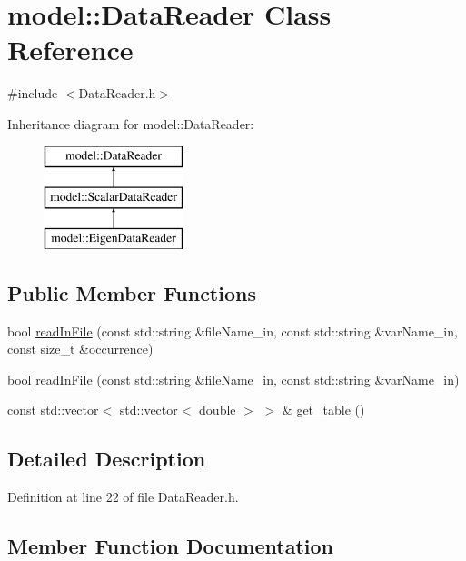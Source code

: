 \hypertarget{classmodel_1_1_data_reader}{}\section{model\+:\+:Data\+Reader Class Reference}
\label{classmodel_1_1_data_reader}


{\ttfamily \#include $<$Data\+Reader.\+h$>$}

Inheritance diagram for model\+:\+:Data\+Reader\+:\begin{figure}[H]
\begin{center}
\leavevmode
\includegraphics[height=3.000000cm]{classmodel_1_1_data_reader}
\end{center}
\end{figure}
\subsection*{Public Member Functions}
\begin{DoxyCompactItemize}
\item 
bool \hyperlink{classmodel_1_1_data_reader_adafdb72c4799ee1f01d9fe9ee1ab98e2}{read\+In\+File} (const std\+::string \&file\+Name\+\_\+in, const std\+::string \&var\+Name\+\_\+in, const size\+\_\+t \&occurrence)
\item 
bool \hyperlink{classmodel_1_1_data_reader_a52fc145f89f02fc5d0f0132ba37da9eb}{read\+In\+File} (const std\+::string \&file\+Name\+\_\+in, const std\+::string \&var\+Name\+\_\+in)
\item 
const std\+::vector$<$ std\+::vector$<$ double $>$ $>$ \& \hyperlink{classmodel_1_1_data_reader_a63b06785038e1f3dd4f003e6aecde5db}{get\+\_\+table} ()
\end{DoxyCompactItemize}


\subsection{Detailed Description}


Definition at line 22 of file Data\+Reader.\+h.



\subsection{Member Function Documentation}
\hypertarget{classmodel_1_1_data_reader_a63b06785038e1f3dd4f003e6aecde5db}{}
